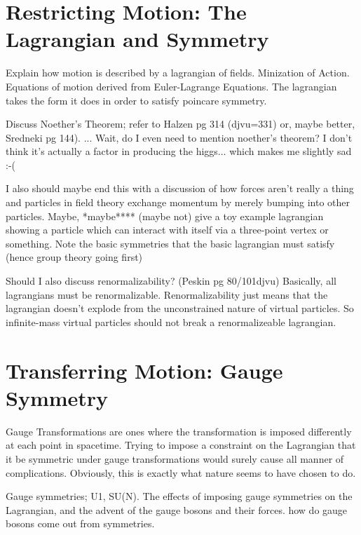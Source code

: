     \cite{Cheng_book}

\section{Restricting Motion: The Lagrangian and Symmetry}

    Explain how motion is described by a lagrangian of fields. 
    Minization of Action.
    Equations of motion derived from Euler-Lagrange Equations.
    The lagrangian takes the form it does in order to satisfy poincare symmetry.

    Discuss Noether's Theorem; refer to Halzen pg 314 (djvu=331) or, maybe better, Sredneki pg 144).
        ... Wait, do I even need to mention noether's theorem?
        I don't think it's actually a factor in producing the higgs... which makes me slightly sad :-(

    I also should maybe end this with a discussion of how forces aren't really a thing
        and particles in field theory exchange momentum by merely bumping into other particles.
    Maybe, *maybe**** (maybe not) give a toy example lagrangian showing a particle which can interact with itself via a three-point vertex or something.
    Note the basic symmetries that the basic lagrangian must satisfy (hence group theory going first)
    
    Should I also discuss renormalizability? (Peskin pg 80/101djvu)
    Basically, all lagrangians must be renormalizable.
    Renormalizability just means that the lagrangian doesn't explode from the unconstrained nature of virtual particles.
    So infinite-mass virtual particles should not break a renormalizeable lagrangian.
    \cite{Halzen_book}


\section{Transferring Motion: Gauge Symmetry}
    Gauge Transformations are ones where the transformation is imposed differently at each point in spacetime.
    Trying to impose a constraint on the Lagrangian that it be symmetric under gauge transformations would surely cause all manner of complications.
    Obviously, this is exactly what nature seems to have chosen to do.

    Gauge symmetries; U1, SU(N).
    The effects of imposing gauge symmetries on the Lagrangian, and the advent of the gauge bosons and their forces.
    how do gauge bosons come out from symmetries.


